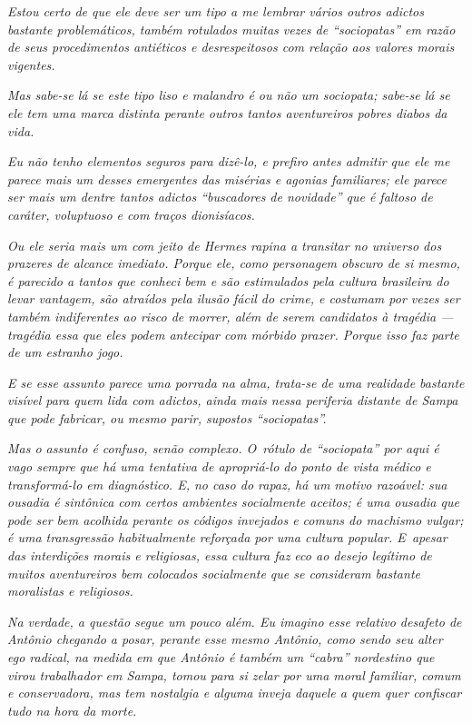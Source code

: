 \emph{Estou certo de que ele deve ser um tipo a me lembrar vários outros
adictos bastante problemáticos, também rotulados muitas vezes de
``sociopatas'' em razão de seus procedimentos antiéticos e
desrespeitosos com relação aos valores morais vigentes.}

\emph{Mas sabe-se lá se este tipo liso e malandro é ou não um sociopata;
sabe-se lá se ele tem uma marca distinta perante outros tantos
aventureiros pobres diabos da vida.}

\emph{Eu não tenho elementos seguros para dizê-lo, e prefiro antes
admitir que ele me parece mais um desses emergentes das misérias e
agonias familiares; ele parece ser mais um dentre tantos adictos
``buscadores de novidade'' que é faltoso de caráter, voluptuoso e com
traços dionisíacos.}

\emph{Ou ele seria mais um com jeito de Hermes rapina a transitar no
universo dos prazeres de alcance imediato. Porque ele, como personagem
obscuro de si mesmo, é parecido a tantos que conheci bem e são
estimulados pela cultura brasileira do levar vantagem, são atraídos pela
ilusão fácil do crime, e costumam por vezes ser também indiferentes ao
risco de morrer, além de serem candidatos à tragédia --- tragédia essa
que eles podem antecipar com mórbido prazer. Porque isso faz parte de um
estranho jogo.}

\emph{E se esse assunto parece uma porrada na alma, trata-se de uma
realidade bastante visível para quem lida com adictos, ainda mais nessa
periferia distante de Sampa que pode fabricar, ou mesmo parir, supostos
``sociopatas''.}

\emph{Mas o assunto é confuso, senão complexo. O~rótulo de ``sociopata''
por aqui é vago sempre que há uma tentativa de apropriá-lo do ponto de
vista médico e transformá-lo em diagnóstico. E, no caso do rapaz, há um
motivo razoável: sua ousadia é sintônica com certos ambientes
socialmente aceitos; é uma ousadia que pode ser bem acolhida perante os
códigos invejados e comuns do machismo vulgar; é uma transgressão
habitualmente reforçada por uma cultura popular. E~apesar das
interdições morais e religiosas, essa cultura faz eco ao desejo legítimo
de muitos aventureiros bem colocados socialmente que se consideram
bastante moralistas e religiosos.}

\emph{Na verdade, a questão segue um pouco além. Eu imagino esse
relativo desafeto de Antônio chegando a posar, perante esse mesmo
Antônio, como sendo seu alter ego radical, na medida em que Antônio é
também um ``cabra'' nordestino que virou trabalhador em Sampa, tomou
para si zelar por uma moral familiar, comum e conservadora, mas tem
nostalgia e alguma inveja daquele a quem quer confiscar tudo na hora da
morte.}

